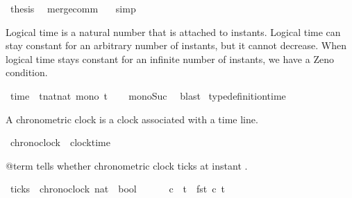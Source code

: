 \begin{isabellebody}
\ {\isacharquery}thesis\ \isamarkupfalse%
\ merge{\isacharunderscore}comm\ \ \isamarkupfalse%
\ simp\isanewline
\ \ \isamarkupfalse%
%
\endisatagproof
{\isafoldproof}%
%
\isadelimproof
%
\endisadelimproof
%
\isadelimdocument
%
\endisadelimdocument
%
\isatagdocument
%
\isamarkuptrue%
%
\endisatagdocument
{\isafolddocument}%
%
\isadelimdocument
%
\endisadelimdocument
%
\begin{isamarkuptext}%
Logical time is a natural number that is attached to instants.
Logical time can stay constant for an arbitrary number of instants, but it cannot decrease.
When logical time stays constant for an infinite number of instants, we have a Zeno condition.%
\end{isamarkuptext}\isamarkuptrue%
\isamarkupfalse%
\ time\ {\isacharequal}\ {\isacartoucheopen}{\isacharbraceleft}t{\isacharcolon}{\isacharcolon}nat{\isasymRightarrow}nat{\isachardot}\ mono\ t{\isacharbraceright}{\isacartoucheclose}\isanewline
%
\isadelimproof
\ \ %
\endisadelimproof
%
\isatagproof
{}\isamarkupfalse%
\ mono{\isacharunderscore}Suc\ \isamarkupfalse%
\ blast%
\endisatagproof
{\isafoldproof}%
%
\isadelimproof
\isanewline
%
\endisadelimproof
\isanewline
{}\isamarkupfalse%
\ type{\isacharunderscore}definition{\isacharunderscore}time%
\begin{isamarkuptext}%
A chronometric clock is a clock associated with a time line.%
\end{isamarkuptext}\isamarkuptrue%
\isamarkupfalse%
\ chronoclock\ {\isacharequal}\ {\isacartoucheopen}clock{\isasymtimes}time{\isacartoucheclose}%
\begin{isamarkuptext}%
@term{} tells whether chronometric clock  ticks at instant .%
\end{isamarkuptext}\isamarkuptrue%
\isamarkupfalse%
\ ticks\ {\isacharcolon}{\isacharcolon}\ {\isacartoucheopen}{\isacharbrackleft}chronoclock{\isacharcomma}\ nat{\isacharbrackright}\ {\isasymRightarrow}\ bool{\isacartoucheclose}\ {\isacharparenleft}\ {\isacartoucheopen}{\isasymnabla}{\isacartoucheclose}\ {}{}{\isacharparenright}\isanewline
\ \ \ {\isacartoucheopen}c\ {\isasymnabla}\ t\ {\isasymequiv}\ {\isacharparenleft}fst\ c{\isacharparenright}\ t{\isacartoucheclose}%
\begin{isamarkuptext}%

\end{isamarkuptext}
\end{isabellebody}
